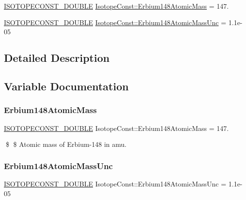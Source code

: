 \begin{DoxyCompactItemize}
\item 
\mbox{\hyperlink{group___isotope_const-_macros_ga8f45a7272ce02c0b4c65c44636ed719a}{I\+S\+O\+T\+O\+P\+E\+C\+O\+N\+S\+T\+\_\+\+D\+O\+U\+B\+LE}} \mbox{\hyperlink{group___isotope_const-_erbium-_er148_gacbca70a84394595ac61a37f6938c0528}{Isotope\+Const\+::\+Erbium148\+Atomic\+Mass}} = 147.
\item 
\mbox{\hyperlink{group___isotope_const-_macros_ga8f45a7272ce02c0b4c65c44636ed719a}{I\+S\+O\+T\+O\+P\+E\+C\+O\+N\+S\+T\+\_\+\+D\+O\+U\+B\+LE}} \mbox{\hyperlink{group___isotope_const-_erbium-_er148_ga3402b9d982c7ee1910b46f4a96f6315c}{Isotope\+Const\+::\+Erbium148\+Atomic\+Mass\+Unc}} = 1.\+1e-\/05
\end{DoxyCompactItemize}


\subsection{Detailed Description}


\subsection{Variable Documentation}
\mbox{\label{group___isotope_const-_erbium-_er148_gacbca70a84394595ac61a37f6938c0528}} 
\subsubsection{\texorpdfstring{Erbium148\+Atomic\+Mass}{Erbium148AtomicMass}}
{\footnotesize\ttfamily \mbox{\hyperlink{group___isotope_const-_macros_ga8f45a7272ce02c0b4c65c44636ed719a}{I\+S\+O\+T\+O\+P\+E\+C\+O\+N\+S\+T\+\_\+\+D\+O\+U\+B\+LE}} Isotope\+Const\+::\+Erbium148\+Atomic\+Mass = 147.}

\$ \$ Atomic mass of Erbium-\/148 in amu. \mbox{\label{group___isotope_const-_erbium-_er148_ga3402b9d982c7ee1910b46f4a96f6315c}} 
\subsubsection{\texorpdfstring{Erbium148\+Atomic\+Mass\+Unc}{Erbium148AtomicMassUnc}}
{\footnotesize\ttfamily \mbox{\hyperlink{group___isotope_const-_macros_ga8f45a7272ce02c0b4c65c44636ed719a}{I\+S\+O\+T\+O\+P\+E\+C\+O\+N\+S\+T\+\_\+\+D\+O\+U\+B\+LE}} Isotope\+Const\+::\+Erbium148\+Atomic\+Mass\+Unc = 1.\+1e-\/05}


